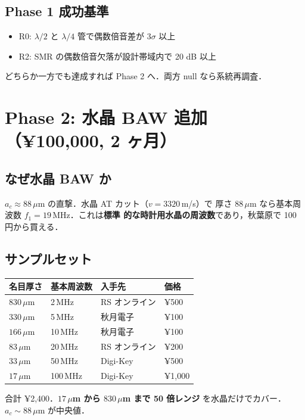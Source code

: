 \documentclass[11pt,a4paper]{article}
\begin{document}
\subsection{Phase 1 成功基準}

\begin{itemize}
\item R0: $\lambda/2$ と $\lambda/4$ 管で偶数倍音差が $3\sigma$ 以上
\item R2: SMR の偶数倍音欠落が設計帯域内で 20 dB 以上
\end{itemize}

どちらか一方でも達成すれば Phase 2 へ．両方 null なら系統再調査．

\section{Phase 2: 水晶 BAW 追加（¥100,000, 2 ヶ月）}

\subsection{なぜ水晶 BAW か}

$a_c \approx 88\,\mu$m の直撃．水晶 AT カット（$v = 3320$\,m/s）で
厚さ $88\,\mu$m なら基本周波数 $f_1 = 19$\,MHz．これは\textbf{標準
的な時計用水晶の周波数}であり，秋葉原で 100 円から買える．

\subsection{サンプルセット}

\begin{center}
\begin{tabular}{llll}
\toprule
名目厚さ & 基本周波数 & 入手先 & 価格 \\
\midrule
$830\,\mu$m & 2\,MHz & RS オンライン & ¥500 \\
$330\,\mu$m & 5\,MHz & 秋月電子 & ¥100 \\
$166\,\mu$m & 10\,MHz & 秋月電子 & ¥100 \\
$83\,\mu$m & 20\,MHz & RS オンライン & ¥200 \\
$33\,\mu$m & 50\,MHz & Digi-Key & ¥500 \\
$17\,\mu$m & 100\,MHz & Digi-Key & ¥1,000 \\
\bottomrule
\end{tabular}
\end{center}

合計 ¥2,400．\textbf{$17\,\mu$m から $830\,\mu$m まで 50 倍レンジ}
を水晶だけでカバー．$a_c \sim 88\,\mu$m が中央値．
\end{document}
